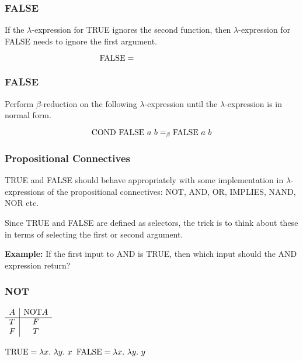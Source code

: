 \documentclass{beamer}
\begin{document}
\begin{frame}
	\frametitle{FALSE}
	
	If the $\lambda$-expression for TRUE ignores the second function, then $\lambda$-expression for FALSE needs to ignore the first argument.

	$$ \FALSE =\hspace{3cm} $$

	\vspace{5cm}
	
\end{frame}

\begin{frame}
	\frametitle{FALSE}

	Perform $\beta$-reduction on the following $\lambda$-expression until the $\lambda$-expression is in normal form. 

	$$ \text{COND} \ \text{FALSE} \ a \ b =_{\beta} \text{FALSE} \ a \ b$$

	\vspace{5cm}

\end{frame}

\begin{frame}
	\frametitle{Propositional Connectives}

	TRUE and FALSE should behave appropriately with some implementation in $\lambda$-expressions of the propositional connectives: NOT, AND, OR, IMPLIES, NAND, NOR etc.

	Since TRUE and FALSE are defined as selectors, the trick is to think about these in terms of selecting the first or second argument. 
	
	\vspace{0.3cm}

	{\bf Example:} If the first input to AND is TRUE, then which input should the AND expression return? 

	\vspace{2cm}

\end{frame}

\begin{frame}
	\frametitle{NOT}

	\begin{center}
		$\begin{array}{ l | c }			
			A &  \text{NOT} A\\
			\cline{1 - 2}
			T &  F \\ 
			F &  T
		\end{array}$
	\end{center}

	$\TRUE = \lambda x. \ \lambda y. \ x$ \hspace{4cm} $\FALSE = \lambda x. \ \lambda y. \ y$

	\vspace{5cm}

\end{frame}
\end{document}
